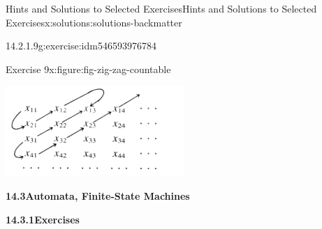\documentclass[oneside,10pt,]{book}
\newcommand{\blocktitlefont}{\relax}
\numberwithin{equation}{section}
\begin{document}
\begin{solutions-chapter}{Hints and Solutions to Selected Exercises}{}{Hints and Solutions to Selected Exercises}{}{}{x:solutions:solutions-backmatter}
\begin{divisionsolution}{14.2.1.9}{}{g:exercise:idm546593976784}
\begin{figureptx}{Exercise 9}{x:figure:fig-zig-zag-countable}{}
\begin{image}{0.15}{0.7}{0.15}%
\includegraphics[width=\linewidth]{images/fig-zig-zag-countable.png}
\end{image}%
\tcblower
\end{figureptx}%
\end{divisionsolution}%
\par\smallskip
\noindent\textbf{\Large{}14.3\space\textperiodcentered\space{}Automata, Finite-State Machines}
\par\smallskip
\par\smallskip
\noindent\textbf{\Large{}14.3.1\space\textperiodcentered\space{}Exercises}
\par\smallskip
{}
\end{solutions-chapter}
\end{document}
